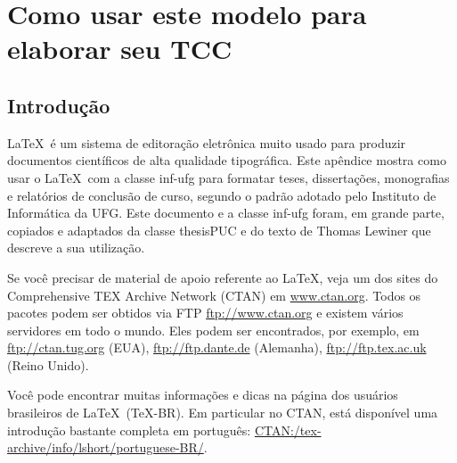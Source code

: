 
\chapter{Como usar este modelo para elaborar seu TCC}
\label{apend:intro}

\section{Introdução}


\LaTeX\ é um sistema de editoração eletrônica muito usado para produzir documentos científicos de alta qualidade tipográfica.
Este apêndice mostra como usar o \LaTeX\ com a classe \textsf{inf-ufg} para formatar teses, dissertações, monografias e relatórios de conclusão de curso, segundo o padrão adotado pelo Instituto de Informática da UFG. Este documento e a classe \textsf{inf-ufg} foram, em grande parte, copiados e adaptados da classe \textsf{thesisPUC} e do texto de Thomas Lewiner \cite{Lew2002} que descreve a sua utilização.

Se você precisar de material de apoio referente ao \LaTeX, veja um dos sites do Comprehensive TEX Archive Network (CTAN) em \href{http://www.ctan.org/}{www.ctan.org}. 
Todos os pacotes podem ser obtidos via \textsf{FTP} \href{ftp://www.ctan.org/}{ftp://www.ctan.org} e existem vários servidores em todo o mundo. Eles podem ser encontrados, por exemplo, em \href{ftp://ctan.tug.org/}{ftp://ctan.tug.org} (EUA), \href{ftp://ftp.dante.de/}{ftp://ftp.dante.de} (Alemanha), \href{ftp://ftp.tex.ac.uk/}{ftp://ftp.tex.ac.uk} (Reino Unido).

Você pode encontrar muitas informações e dicas na página dos usuários brasileiros de \LaTeX\ (\TeX-BR). 
Em particular no CTAN, está disponível uma introdução bastante completa em português: \href{http://www.ctan.org/tex-archive/info/lshort/portuguese-BR/lshortBR.pdf}{CTAN:/tex-archive/info/lshort/portuguese-BR/}. 

